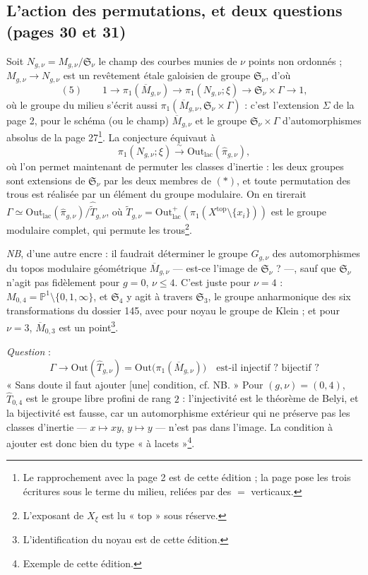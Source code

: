 \documentclass[11pt,a4paper]{article}
\begin{document}
\subsection*{L'action des permutations, et deux questions (pages 30 et 31)}

Soit $N_{g,\nu} = M_{g,\nu}/\mathfrak{S}_\nu$ le champ des courbes munies de
$\nu$ points non ordonnés ; $M_{g,\nu} \to N_{g,\nu}$ est un revêtement étale
galoisien de groupe $\mathfrak{S}_\nu$, d'où
\[
(5)\qquad 1 \longrightarrow \pi_1(\overline{M}_{g,\nu}) \longrightarrow
\pi_1(N_{g,\nu}; \xi) \longrightarrow \mathfrak{S}_\nu \times \Gamma
\longrightarrow 1,
\]
où le groupe du milieu s'écrit aussi $\pi_1(\overline{M}_{g,\nu},
\mathfrak{S}_\nu \times \Gamma)$ : c'est l'extension $\Sigma$ de la page 2,
pour le schéma (ou le champ) $\overline{M}_{g,\nu}$ et le groupe
$\mathfrak{S}_\nu \times \Gamma$ d'automorphismes absolus de la page
27\footnote{Le rapprochement avec la page 2 est de cette édition ; la page
pose les trois écritures sous le terme du milieu, reliées par des $=$
verticaux.}. La conjecture équivaut à
\[
\pi_1(N_{g,\nu}; \xi) \xrightarrow{\ \sim\ }
\mathrm{Out}_{\mathrm{lac}}(\widehat\pi_{g,\nu}),
\]
où l'on permet maintenant de permuter les classes d'inertie : les deux
groupes sont extensions de $\mathfrak{S}_\nu$ par les deux membres de $(*)$,
et toute permutation des trous est réalisée par un élément du groupe
modulaire. On en tirerait $\Gamma \simeq
\mathrm{Out}_{\mathrm{lac}}(\widehat\pi_{g,\nu})/\widehat{\widetilde T}_{g,\nu}$, où
$\widetilde T_{g,\nu} = \mathrm{Out}^{+}_{\mathrm{lac}}(\pi_1(X^{\mathrm{top}}
\setminus \{x_i\}))$ est le groupe modulaire complet, qui permute les
trous\footnote{L'exposant de $X_\xi$ est lu « top » sous réserve.}.

\emph{NB}, d'une autre encre : il faudrait déterminer le groupe
$G_{g,\nu}$ des automorphismes du topos modulaire géométrique
$\overline{M}_{g,\nu}$ — est-ce l'image de $\mathfrak{S}_\nu$ ? —, sauf que
$\mathfrak{S}_\nu$ n'agit pas fidèlement pour $g = 0$, $\nu \leq 4$. C'est
juste pour $\nu = 4$ : $M_{0,4} = \mathbb{P}^1 \setminus \{0, 1, \infty\}$, et
$\mathfrak{S}_4$ y agit à travers $\mathfrak{S}_3$, le groupe anharmonique des
six transformations du dossier 145, avec pour noyau le groupe de Klein ; et
pour $\nu = 3$, $\overline{M}_{0,3}$ est un point\footnote{L'identification du noyau est
de cette édition.}.

\emph{Question} :
\[
\Gamma \longrightarrow \mathrm{Out}(\widehat T_{g,\nu}) =
\mathrm{Out}\bigl(\pi_1(\overline{M}_{g,\nu})\bigr) \quad \text{est-il
injectif ? bijectif ?}
\]
« Sans doute il faut ajouter [une] condition, cf. NB. » Pour $(g, \nu) = (0,
4)$, $\widehat T_{0,4}$ est le groupe libre profini de rang $2$ : l'injectivité
est le théorème de Belyi, et la bijectivité est fausse, car un automorphisme
extérieur qui ne préserve pas les classes d'inertie — $x \mapsto xy$, $y \mapsto
y$ — n'est pas dans l'image. La condition à ajouter est donc bien du type
« à lacets »\footnote{Exemple de cette édition.}.
\end{document}
